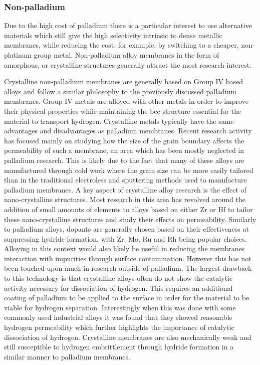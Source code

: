 \eject \pdfpagewidth=8.3in \pdfpageheight=11.7in

\subsubsection*{Non-palladium}\label{nonpdreview}
Due to the high cost of palladium there is a particular interest to use alternative materials which still give the high selectivity intrinsic to dense metallic membranes, while reducing the cost, for example, by switching to a cheaper, non-platinum group metal. Non-palladium alloy membranes in the form of amorphous, or crystalline structures generally attract the most research interest.

Crystalline non-palladium membranes are generally based on Group IV based alloys and follow a similar philosophy to the previously discussed palladium membranes. Group IV metals are alloyed with other metals in order to improve their physical properties while maintaining the bcc structure essential for the material to transport hydrogen. Crystalline metals typically have the same advantages and disadvantages as palladium membranes. Recent research activity has focused mainly on studying how the size of the grain boundary affects the permeability of such a membrane, an area which has been mostly neglected in palladium research. \cite{NathanW.Ockwig2007a} This is likely due to the fact that many of these alloys are manufactured through cold work where the grain size can be more easily tailored than in the traditional electroless and sputtering methods used to manufacture palladium membranes. A key aspect of crystalline alloy research is the effect of nano-crystalline structures. Most research in this area has revolved around the addition of small amounts of elements to alloys based on either Zr or Hf to tailor these nano-crystalline structures and study their effects on permeability. Similarly to palladium alloys, dopants are generally chosen based on their effectiveness at suppressing hydride formation, with Zr, Mo, Ru and Rh being popular choices. \cite{Kong2011, DosSantos1998, Yukawa2002, Yukawa2002a, Yukawa2003} Alloying in this context would also likely be useful in reducing the membranes interaction with impurities through surface contamination. However this has not been touched upon much in research outside of palladium. The largest drawback to this technology is that crystalline alloys often do not show the catalytic activity necessary for dissociation of hydrogen. This requires an additional coating of palladium to be applied to the surface in order for the material to be viable for hydrogen separation. Interestingly when this was done with some commonly used industrial alloys \cite{Xu1994} it was found that they showed reasonable hydrogen permeability which further highlights the importance of catalytic dissociation of hydrogen. Crystalline membranes are also mechanically weak and still susceptible to hydrogen embrittlement through hydride formation in a similar manner to palladium membranes. \cite{NathanW.Ockwig2007a}

